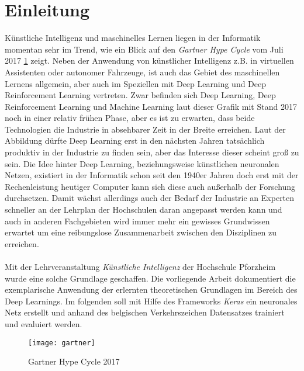 
\section{Einleitung}
Künstliche Intelligenz und maschinelles Lernen liegen in der Informatik momentan sehr im Trend, wie ein Blick auf den \textit{Gartner Hype Cycle} vom Juli 2017 \ref{pic:gartner} \cite{gartner} zeigt. Neben der Anwendung von künstlicher Intelligenz z.B. in virtuellen Assistenten oder autonomer Fahrzeuge, ist auch das Gebiet des maschinellen Lernens allgemein, aber auch im Speziellen mit Deep Learning und Deep Reinforcement Learning vertreten. Zwar befinden sich Deep Learning, Deep Reinforcement Learning und Machine Learning laut dieser Grafik mit Stand 2017 noch in einer relativ frühen Phase, aber es ist zu erwarten, dass beide Technologien die Industrie in absehbarer Zeit in der Breite erreichen. Laut der Abbildung dürfte Deep Learning erst in den nächsten Jahren tatsächlich produktiv in der Industrie zu finden sein, aber das Interesse dieser scheint groß zu sein. 
Die Idee hinter Deep Learning, beziehungsweise künstlichen neuronalen Netzen, existiert in der Informatik schon seit den 1940er Jahren \cite{Kriesel2007NeuralNetworks} doch erst mit der Rechenleistung heutiger Computer kann sich diese auch außerhalb der Forschung durchsetzen. 
Damit wächst allerdings auch der Bedarf der Industrie an Experten schneller an der Lehrplan der Hochschulen daran angepasst werden kann und auch in anderen Fachgebieten wird immer mehr ein gewisses Grundwissen erwartet um eine reibungslose Zusammenarbeit zwischen den Disziplinen zu erreichen. \\
\\
Mit der Lehrveranstaltung \textit{Künstliche Intelligenz} der Hochschule Pforzheim wurde eine solche Grundlage geschaffen. Die vorliegende Arbeit dokumentiert die exemplarische Anwendung der erlernten theoretischen Grundlagen im Bereich des Deep Learnings. Im folgenden soll mit Hilfe des Frameworks \textit{Keras} ein neuronales Netz erstellt und anhand des belgischen Verkehrszeichen Datensatzes trainiert und evaluiert werden. 

\begin{figure} [H]
	\centering
	\texttt{[image: gartner]}
	\caption{Gartner Hype Cycle 2017 \cite{gartner}}
	\label{pic:gartner}
\end{figure}

